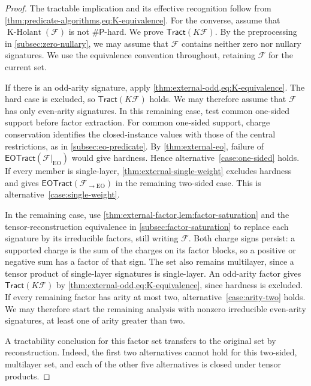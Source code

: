 \documentclass[11pt,letterpaper,onecolumn]{article}
\theoremstyle{plain}
\theoremstyle{definition}
\theoremstyle{remark}
\newcommand{\cF}{\mathcal F}
\newcommand{\KHolant}{\operatorname{K\text{-}Holant}}
\newcommand{\EOTract}{\mathsf{EOTract}}
\newcommand{\Tract}{\mathsf{Tract}}
\newcommand{\SharpP}{\#\mathsf P}
\newcommand{\EO}{\mathrm{EO}}
\begin{document}
	\begin{proof}
		The tractable implication and its effective recognition follow from
		\cref{thm:predicate-algorithms,eq:K-equivalence}. For the converse, assume that
		\(\KHolant(\cF)\) is not \(\SharpP\)-hard. We prove
		\(\Tract(K\cF)\).
		By the preprocessing in \cref{subsec:zero-nullary}, we may assume that
		\(\cF\) contains neither zero nor nullary signatures.  We use the equivalence
		convention throughout, retaining \(\cF\) for the current set.
		
		If there is an odd-arity signature, apply
		\cref{thm:external-odd,eq:K-equivalence}. The hard case is excluded,
		so \(\Tract(K\cF)\) holds.  We may therefore assume that \(\cF\) has only
		even-arity signatures.  In this remaining case,
		test common one-sided support before factor extraction. For common one-sided support, charge conservation identifies the
		closed-instance values with those of the central restrictions, as in
		\cref{subsec:eo-predicate}. By \cref{thm:external-eo}, failure of
		\(\EOTract(\cF|_{\EO})\) would give hardness. Hence
		alternative~\ref{case:one-sided} holds.  If every member is single-layer, \cref{thm:external-single-weight} excludes hardness and gives
		\(\EOTract(\cF_{\to\EO})\) in the remaining two-sided case.
		This is alternative~\ref{case:single-weight}.

		In the remaining case, use \cref{thm:external-factor,lem:factor-saturation} and the
		tensor-reconstruction equivalence in \cref{subsec:factor-saturation}
		to replace each
		signature by its irreducible factors, still writing \(\cF\).
		Both charge signs persist: a supported charge is the sum of the charges
		on its factor blocks, so a positive or negative sum has a factor of that
		sign.  The set also remains multilayer, since a tensor product of
		single-layer signatures is single-layer.
		An odd-arity factor gives \(\Tract(K\cF)\) by
		\cref{thm:external-odd,eq:K-equivalence}, since hardness is excluded.
		If every remaining factor has arity at most two,
		alternative~\ref{case:arity-two} holds.
		We may therefore start the remaining analysis with nonzero irreducible
		even-arity signatures, at least one of arity greater than two.

		A tractability conclusion for this factor set transfers to the original
		set by reconstruction.  Indeed, the first two alternatives cannot hold
		for this two-sided, multilayer set, and each of the other five
		alternatives is closed under tensor products.
		

\end{proof}
\end{document}
